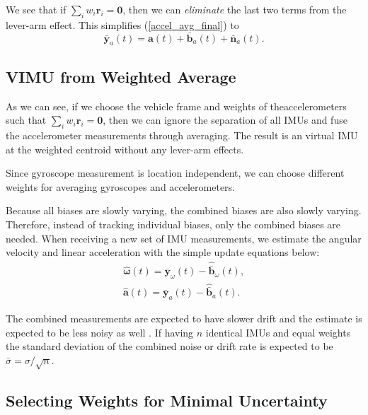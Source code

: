 \documentclass[conference]{IEEEtran}
\begin{document}
\noindent We see that if $\sum_i{w_i \textbf{r}_i} = \textbf{0}$, then we can {\em eliminate} the last two terms from the lever-arm effect. This simplifies (\ref{accel_avg_final}) to
\begin{equation}
    \bar{\textbf{y}}_a(t) = \textbf{a}(t) + \bar{\textbf{b}}_a(t) + \bar{\textbf{n}}_a(t).
\end{equation}

\subsection{VIMU from Weighted Average}\label{AA}

As we can see, if we choose the vehicle frame and weights of theaccelerometers such that $\sum_i{w_i \textbf{r}_i} = \textbf{0}$, then we can ignore the separation of all IMUs and fuse the accelerometer measurements through averaging. The result is an virtual IMU at the weighted centroid without any lever-arm effects.

Since gyroscope measurement is location independent, we can choose different weights for averaging gyroscopes and accelerometers.

Because all biases are slowly varying, the combined biases are also slowly varying. Therefore, instead of tracking individual biases, only the combined biases are needed. When receiving a new set of IMU measurements, we estimate the angular velocity and linear acceleration with the simple update equations below:
\begin{equation}
\begin{split}
    \hat{\bm{\omega}}(t) = \bar{\textbf{y}}_\omega(t) - \hat{\bar{\textbf{b}}}_\omega(t), \\
    \hat{\textbf{a}}(t)  = \bar{\textbf{y}}_a(t) - \hat{\bar{\textbf{b}}}_a(t).
\end{split}
\end{equation}

The combined measurements are expected to have slower drift and the estimate is expected to be less noisy as well \cite{patel2022_multi-imu}. If having $n$ identical IMUs and equal weights the standard deviation of the combined noise or drift rate is expected to be $\bar{\sigma} = \sigma / \sqrt{n}$.

\subsection{Selecting Weights for Minimal Uncertainty}\label{solve_weight_by_noise}
\end{document}
